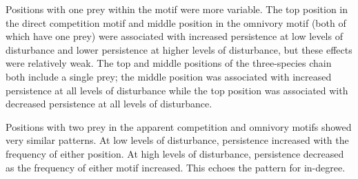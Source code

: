 \documentclass[12pt]{article}
\begin{document}
\begin{spacing}{2.0}
        Positions with one prey within the motif were more variable.
        The top position in the direct competition motif and middle position in the omnivory motif (both of which have one prey) were associated with increased persistence at low levels of disturbance and lower persistence at higher levels of disturbance, but these effects were relatively weak.
        The top and middle positions of the three-species chain both include a single prey; the middle position was associated with increased persistence at all levels of disturbance while the top position was associated with decreased persistence at all levels of disturbance.
        
        
        Positions with two prey in the apparent competition and omnivory motifs showed very similar patterns.
        At low levels of disturbance, persistence increased with the frequency of either position.
        At high levels of disturbance, persistence decreased as the frequency of either motif increased.
        This echoes the pattern for in-degree.
        

\end{spacing}
\end{document}
